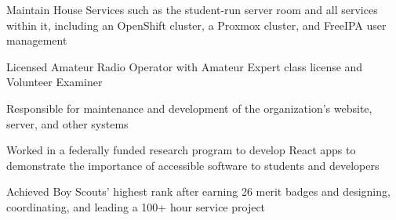 \vspace{4pt plus 1pt minus 1pt}


\smallskip
\smallskip


\medskip


\medskip


Maintain House Services such as the student-run server room and all services within it, including an OpenShift cluster, a Proxmox cluster, and FreeIPA user management

\divider

Licensed Amateur Radio Operator with Amateur Expert class license and Volunteer Examiner

\divider

Responsible for maintenance and development of the organization's website, server, and other systems

\divider

Worked in a federally funded research program to develop React apps to demonstrate the importance of accessible software to students and developers

\divider

Achieved Boy Scouts' highest rank after earning 26 merit badges and designing, coordinating, and leading a 100+ hour service project


